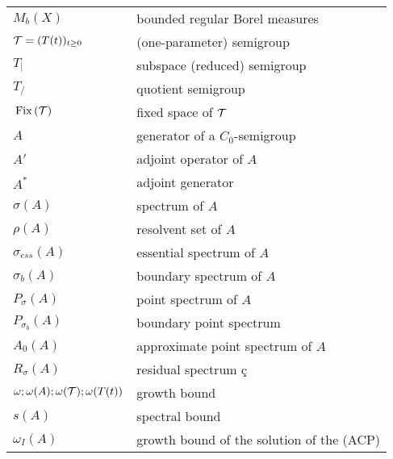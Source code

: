 \begin{longtable}{p{}p{}}
$M_{b}(X)$ & bounded regular Borel measures \\ %
$\mathcal{T} = (T(t))_{t \geq 0}$ & (one-parameter) semigroup \\ %
$T_{|}$ & subspace (reduced) semigroup \\ %
$T_{/}$ & quotient semigroup \\ %
$\mathop{}\mathrm{Fix}\left(\mathcal{T}\right)$ & fixed space of $\mathcal{T}$ \\ %
%
%
%
$A$ & generator of a $C_{0}$-semigroup\\ %
$A'$ & adjoint operator of $A$\\ %
$A^*$ & adjoint generator \\ %
$\sigma(A)$ & spectrum of $A$\\ %
$\rho(A)$ & resolvent set of $A$\\ %
$\sigma_{ess}(A)$ & essential spectrum of $A$\\ %
$\sigma_{b}(A)$ & boundary spectrum of $A$\\ %
$P_{\sigma}(A)$ & point spectrum of $A$\\ %
$P_{\sigma_b}(A)$ & boundary point spectrum \\ %
$A_{0}(A)$ & approximate point spectrum of $A$\\ %
$R_{\sigma}(A)$ & residual spectrum \c c\\ %
$\omega; \omega(A); \omega(\mathcal{T}); \omega(T(t))$ & growth bound \\ %
$s(A)$ & spectral bound \\ %
$\omega_I(A)$ & growth bound of the solution of the (ACP) \\ %

\end{longtable}
